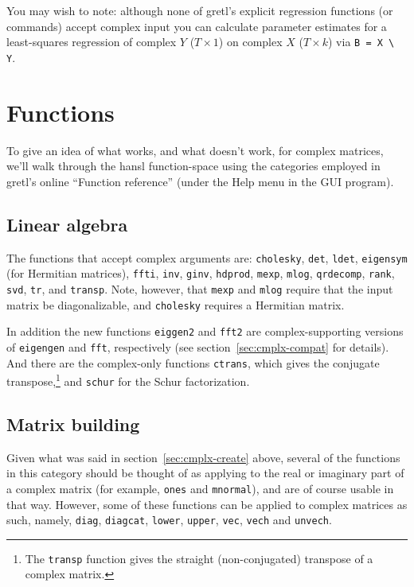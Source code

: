 You may wish to note: although none of gretl's explicit regression
functions (or commands) accept complex input you can calculate
parameter estimates for a least-squares regression of complex $Y$
($T \times 1$) on complex $X$ ($T \times k$) via \verb|B = X \ Y|.

\section{Functions}
\label{sec:cmplx-funcs}

To give an idea of what works, and what doesn't work, for complex
matrices, we'll walk through the hansl function-space using the
categories employed in gretl's online ``Function reference'' (under the
\textsf{Help} menu in the GUI program).

\subsection{Linear algebra}

The functions that accept complex arguments are: \texttt{cholesky},
\texttt{det}, \texttt{ldet}, \texttt{eigensym} (for Hermitian
matrices), \texttt{ffti}, \texttt{inv}, \texttt{ginv},
\texttt{hdprod}, \texttt{mexp}, \texttt{mlog}, \texttt{qrdecomp},
\texttt{rank}, \texttt{svd}, \texttt{tr}, and \texttt{transp}. Note,
however, that \texttt{mexp} and \texttt{mlog} require that the input
matrix be diagonalizable, and \texttt{cholesky} requires a Hermitian
matrix.

In addition the new functions \texttt{eiggen2} and \texttt{fft2} are
complex-supporting versions of \texttt{eigengen} and \texttt{fft},
respectively (see section~\ref{sec:cmplx-compat} for details). And
there are the complex-only functions \texttt{ctrans}, which gives the
conjugate transpose,\footnote{The \texttt{transp} function gives the
  straight (non-conjugated) transpose of a complex matrix.} and
\texttt{schur} for the Schur factorization.

\subsection{Matrix building}

Given what was said in section~\ref{sec:cmplx-create} above, several
of the functions in this category should be thought of as applying to
the real or imaginary part of a complex matrix (for example,
\texttt{ones} and \texttt{mnormal}), and are of course usable in that
way.  However, some of these functions can be applied to complex
matrices as such, namely, \texttt{diag}, \texttt{diagcat},
\texttt{lower}, \texttt{upper}, \texttt{vec}, \texttt{vech} and
\texttt{unvech}.


